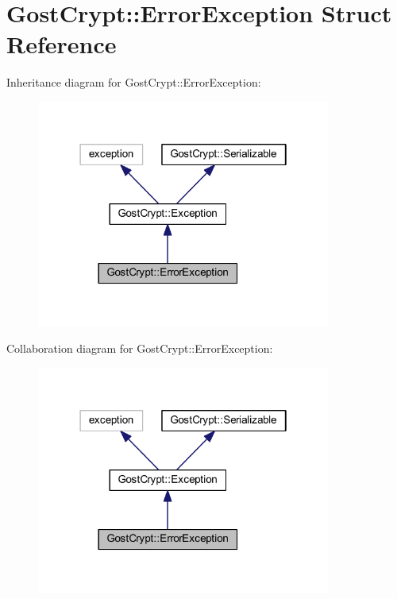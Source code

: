 \hypertarget{struct_gost_crypt_1_1_error_exception}{}\section{Gost\+Crypt\+:\+:Error\+Exception Struct Reference}
\label{struct_gost_crypt_1_1_error_exception}


Inheritance diagram for Gost\+Crypt\+:\+:Error\+Exception\+:
\nopagebreak
\begin{figure}[H]
\begin{center}
\leavevmode
\includegraphics[width=274pt]{struct_gost_crypt_1_1_error_exception__inherit__graph}
\end{center}
\end{figure}


Collaboration diagram for Gost\+Crypt\+:\+:Error\+Exception\+:
\nopagebreak
\begin{figure}[H]
\begin{center}
\leavevmode
\includegraphics[width=274pt]{struct_gost_crypt_1_1_error_exception__coll__graph}
\end{center}
\end{figure}

